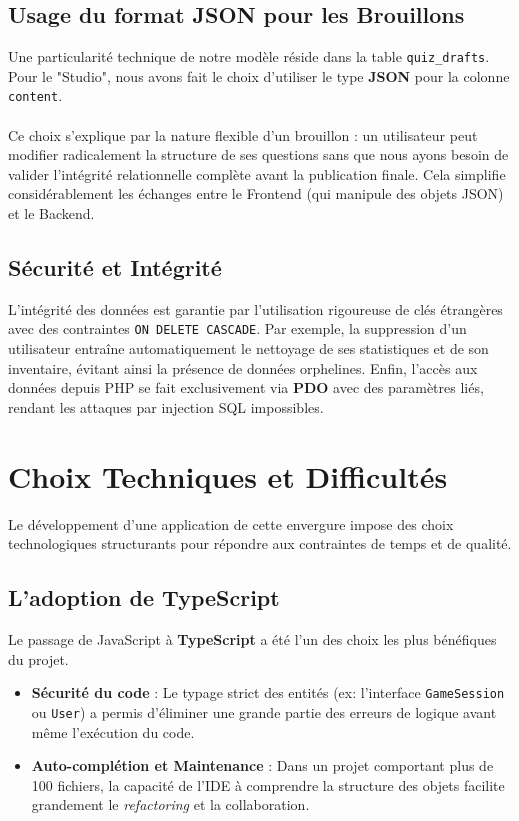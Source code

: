 \documentclass[12pt,a4paper]{article}
\begin{document}
\subsection{Usage du format JSON pour les Brouillons}
Une particularité technique de notre modèle réside dans la table \texttt{quiz\_drafts}. Pour le "Studio", nous avons fait le choix d'utiliser le type \textbf{JSON} pour la colonne \texttt{content}.
\\
\\
Ce choix s'explique par la nature flexible d'un brouillon : un utilisateur peut modifier radicalement la structure de ses questions sans que nous ayons besoin de valider l'intégrité relationnelle complète avant la publication finale. Cela simplifie considérablement les échanges entre le Frontend (qui manipule des objets JSON) et le Backend.

\subsection{Sécurité et Intégrité}
L'intégrité des données est garantie par l'utilisation rigoureuse de clés étrangères avec des contraintes \texttt{ON DELETE CASCADE}. Par exemple, la suppression d'un utilisateur entraîne automatiquement le nettoyage de ses statistiques et de son inventaire, évitant ainsi la présence de données orphelines. Enfin, l'accès aux données depuis PHP se fait exclusivement via \textbf{PDO} avec des paramètres liés, rendant les attaques par injection SQL impossibles.



\section{Choix Techniques et Difficultés}

Le développement d'une application de cette envergure impose des choix technologiques structurants pour répondre aux contraintes de temps et de qualité.

\subsection{L'adoption de TypeScript}
Le passage de JavaScript à \textbf{TypeScript} a été l'un des choix les plus bénéfiques du projet. 
\begin{itemize}
    \item \textbf{Sécurité du code} : Le typage strict des entités (ex: l'interface \texttt{GameSession} ou \texttt{User}) a permis d'éliminer une grande partie des erreurs de logique avant même l'exécution du code.
    \item \textbf{Auto-complétion et Maintenance} : Dans un projet comportant plus de 100 fichiers, la capacité de l'IDE à comprendre la structure des objets facilite grandement le \textit{refactoring} et la collaboration.
\end{itemize}
\end{document}
